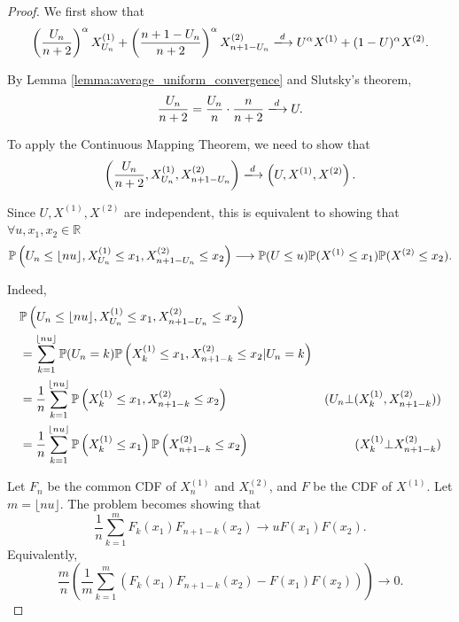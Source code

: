 \begin{proof}
  We first show that
  $$\left(\dfrac{U_n}{n+2}\right)^\alpha X_{U_n}^{(1)} + \left(\dfrac{n+1-U_n}{n+2}\right)^\alpha X_{n+1-U_n}^{(2)} \xlongrightarrow{d} U^\alpha X^{(1)} + (1-U)^\alpha X^{(2)}.$$

  By Lemma \ref{lemma:average_uniform_convergence} and Slutsky's theorem,
  $$\dfrac{U_n}{n+2} = \dfrac{U_n}{n} \cdot \dfrac{n}{n+2} \xlongrightarrow{d} U.$$

  To apply the Continuous Mapping Theorem, we need to show that
  $$\left(\dfrac{U_n}{n+2}, X_{U_n}^{(1)}, X_{n+1-U_n}^{(2)}\right) \xlongrightarrow{d} \left(U, X^{(1)}, X^{(2)}\right).$$

  Since $U, X^{(1)}, X^{(2)}$ are independent, this is equivalent to showing that $\forall u, x_1, x_2 \in \mathbb{R}$
  $$\mathbb{P}\left(U_n \le \lfloor nu \rfloor, X_{U_n}^{(1)} \le x_1, X_{n+1-U_n}^{(2)} \le x_2\right) \longrightarrow \mathbb{P}(U \le u) \mathbb{P}(X^{(1)} \le x_1) \mathbb{P}(X^{(2)} \le x_2).$$

  Indeed,
  \begin{align*}
     & \mathbb{P}\left(U_n \le \lfloor nu \rfloor, X_{U_n}^{(1)} \le x_1, X_{n+1-U_n}^{(2)} \le x_2\right)                                                                         \\
     & = \sum_{k=1}^{\lfloor nu \rfloor} \mathbb{P}(U_n=k) \mathbb{P}\left(X_{k}^{(1)} \le x_1, X_{n+1-k}^{(2)} \le x_2 | U_n=k\right)                                                    \\
     & =  \dfrac{1}{n}\sum_{k=1}^{\lfloor nu \rfloor} \mathbb{P}\left(X_{k}^{(1)} \le x_1, X_{n+1-k}^{(2)} \le x_2\right)               & (U_n\bot (X_{k}^{(1)}, X_{n+1-k}^{(2)})) \\
     & =  \dfrac{1}{n}\sum_{k=1}^{\lfloor nu \rfloor} \mathbb{P}\left(X_{k}^{(1)} \le x_1\right)\mathbb{P}\left(X_{n+1-k}^{(2)} \le x_2\right) & (X_{k}^{(1)} \bot X_{n+1-k}^{(2)})       \\
  \end{align*}

  Let $F_n$ be the common CDF of $X_n^{(1)}$ and $X_n^{(2)}$, and $F$ be the CDF of $X^{(1)}$. Let $m = \lfloor nu \rfloor$. The problem becomes showing that
  $$\dfrac{1}{n}\sum_{k=1}^{m} F_k(x_1)F_{n+1-k}(x_2) \longrightarrow u F(x_1) F(x_2).$$
  Equivalently,
  $$\dfrac{m}{n}\left(\dfrac{1}{m}\sum_{k=1}^{m} \left(F_k(x_1)F_{n+1-k}(x_2)-F(x_1) F(x_2)\right)\right) \longrightarrow 0.$$


\end{proof}
